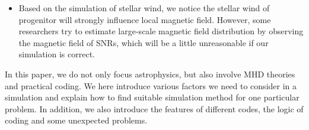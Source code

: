 \begin{itemize}
   \item Based on the simulation of stellar wind, we notice the stellar wind of progenitor will
   strongly influence local magnetic field.
   However, some researchers try to estimate large-scale magnetic field distribution by
   observing the magnetic field of SNRs, which will be a little unreasonable if our simulation
   is correct.
\end{itemize}

   In this paper, we do not only focus astrophysics, but also involve MHD theories and practical
   coding.
   We here introduce various factors we need to consider in a simulation and explain how to find
   suitable simulation method for one particular problem.
   In addition, we also introduce the features of different codes, the logic of coding and some
   unexpected problems.
   
